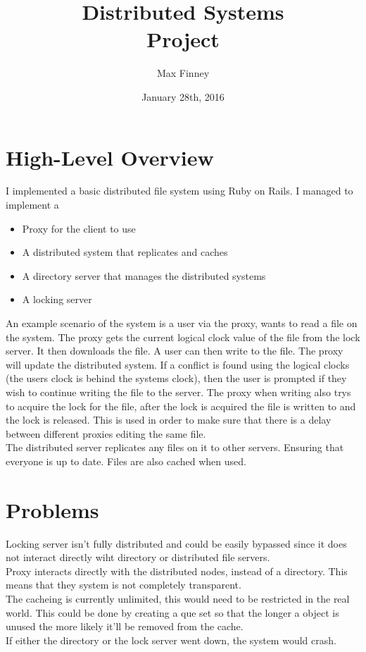 \documentclass[12pt]{article}
\begin{document}
	\title{Distributed Systems\\Project	}
	\date{January 28th, 2016}
	\author{Max Finney}	
	\maketitle
\section*{High-Level Overview}
I implemented a basic distributed file system using Ruby on Rails. I managed to implement a 
\begin{itemize}
\item Proxy for the client to use
\item A distributed system that replicates and caches
\item A directory server that manages the distributed systems
\item A locking server
\end{itemize}
An example scenario of the system is a user via the proxy, wants to read a file on the system. The proxy gets the current logical clock value of the file from the lock server. It then downloads the file. A user can then write to the file. The proxy will update the distributed system. If a conflict is found using the logical clocks (the users clock is behind the systems clock), then the user is prompted if they wish to continue writing the file to the server. The proxy when writing also trys to acquire the lock for the file, after the lock is acquired the file is written to and the lock is released. This is used in order to make sure that there is a delay between different proxies editing the same file. \\
The distributed server replicates any files on it to other servers. Ensuring that everyone is up to date. Files are also cached when used.
\section*{Problems}
Locking server isn't fully distributed and could be easily bypassed since it does not interact directly wiht directory or distributed file servers.\\
Proxy interacts directly with the distributed nodes, instead of a directory. This means that they system is not completely transparent.\\
The cacheing is currently unlimited, this would need to be restricted in the real world. This could be done by creating a que set so that the longer a object is unused the more likely it'll be removed from the cache.\\
If either the directory or the lock server went down, the system would crash.
\end{document}
